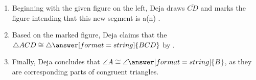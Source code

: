 \documentclass[nooutcomes]{ximera}
\begin{document}
\begin{problem}
\begin{image}
\end{image}

\begin{enumerate}
\item Beginning with the given figure on the left, Deja draws $\overline{CD}$ and marks the figure intending that this new segment is a(n) .

\item Based on the marked figure, Deja claims that the $\triangle ACD\cong \triangle\answer[format=string]{BCD}$ by . 

\item Finally, Deja concludes that $\angle A\cong \angle\answer[format=string]{B}$, as they are corresponding parts of congruent triangles. 
\end{enumerate}

\end{problem}
\end{document}
